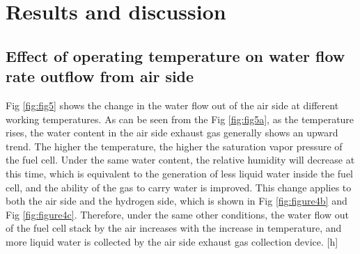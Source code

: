 \section{Results and discussion}
\subsection{Effect of operating temperature on water flow rate outflow from air side}

Fig \ref{fig:fig5} shows the change in the water flow out of the air side at different working temperatures. As can be seen from the Fig \ref{fig:fig5a}, as the temperature rises, the water content in the air side exhaust gas generally shows an upward trend. The higher the temperature, the higher the saturation vapor pressure of the fuel cell. Under the same water content, the relative humidity will decrease at this time, which is equivalent to the generation of less liquid water inside the fuel cell, and the ability of the gas to carry water is improved. This change applies to both the air side and the hydrogen side, which is shown in Fig \ref{fig:figure4b} and Fig \ref{fig:figure4c}. Therefore, under the same other conditions, the water flow out of the fuel cell stack by the air increases with the increase in temperature, and more liquid water is collected by the air side exhaust gas collection device.
[h]


